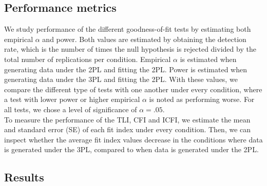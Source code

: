 \documentclass[Royal,sageapa,times,doublespace]{sagej}
\begin{document}
\subsection{Performance metrics}
We study performance of the different goodness-of-fit tests by estimating both empirical $\alpha$ and power. Both values are estimated by obtaining the detection rate, which is the number of times the null hypothesis is rejected divided by the total number of replications per condition. Empirical $\alpha$ is estimated when generating data under the 2PL and fitting the 2PL. Power is estimated when generating data under the 3PL and fitting the 2PL. With these values, we compare the different type of tests with one another under every condition, where a test with lower power or higher empirical $\alpha$ is noted as performing worse. For all tests, we chose a level of significance of $\alpha = .05$. \\
\indent To measure the performance of the TLI, CFI and ICFI, we estimate the mean and standard error (SE) of each fit index under every condition. Then, we can inspect whether the average fit index values decrease in the conditions where data is generated under the 3PL, compared to when data is generated under the 2PL. 

\subsection{Results}
\end{document}
